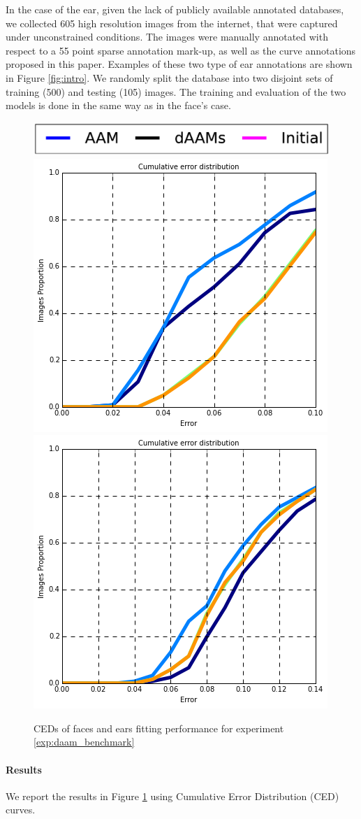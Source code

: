 In the case of the ear, given the lack of publicly available annotated databases, we collected 605 high resolution images from the internet, that were captured under unconstrained conditions. The images were manually annotated with respect to a 55 point sparse annotation mark-up, as well as the curve annotations proposed in this paper. Examples of these two type of ear annotations are shown in Figure \ref{fig:intro}. We randomly split the database into two disjoint sets of training (500) and testing (105) images. The training and evaluation of the two models is done in the same way as in the face's case.

\begin{figure}[b!]
    \centering
    \includegraphics[width=0.6\columnwidth]{resources/DAAMBenchmark/legend}
    \\
    \includegraphics[width=0.48\columnwidth]{resources/DAAMBenchmark/face}
    \includegraphics[width=0.48\columnwidth]{resources/DAAMBenchmark/ear}
    \caption{CEDs of faces and ears fitting performance for experiment \ref{exp:daam_benchmark}}
    \label{fig:daam_benchmark}
\end{figure}


\paragraph{Results} We report the results in Figure \ref{fig:daam_benchmark} using Cumulative Error Distribution (CED) curves.

